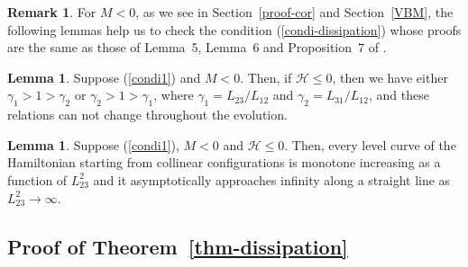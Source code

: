 \documentclass{article}
\theoremstyle{definition}
\newtheorem{lemma}[theorem]{Lemma}
\newtheorem{remark}[theorem]{Remark}
\begin{document}
\begin{remark}
For $M<0$, as we see in Section~\ref{proof-cor} and Section~\ref{VBM},  the following lemmas help us to check the condition (\ref{condi-dissipation}) whose proofs are the same as those of Lemma~5, Lemma~6 and Proposition~7 of \cite{G.2}. 
\begin{lemma}
Suppose (\ref{condi1}) and $M < 0$. Then, if $\mathscr{H} \leq 0$, then we have either $\gamma_1 > 1 > \gamma_2$ or $\gamma_2 > 1 > \gamma_1$, where $\gamma_1=L_{23}/L_{12}$ and
$\gamma_2 = L_{31}/L_{12}$, and these relations can not change throughout the evolution.
\label{RangeH-}
\end{lemma}

\begin{lemma}
Suppose (\ref{condi1}), $M < 0$ and $\mathscr{H} \leq 0$. Then, every level curve of the Hamiltonian starting from collinear configurations
 is monotone increasing as a function of $L_{23}^2$ and it  asymptotically approaches infinity along a straight line as $L_{23}^2 \rightarrow \infty$. 
\label{asympt-}
\end{lemma}
\end{remark}



















\subsection{Proof of Theorem~\ref{thm-dissipation}}
\label{proof}
\end{document}

